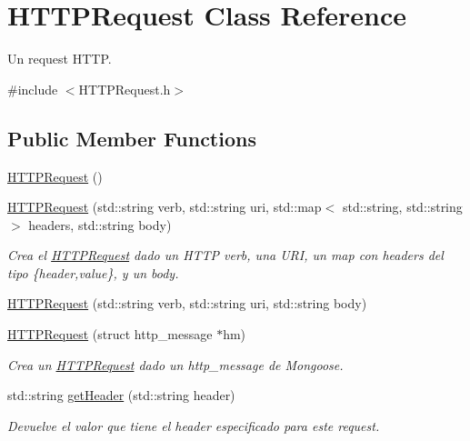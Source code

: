 \hypertarget{class_h_t_t_p_request}{}\section{H\+T\+T\+P\+Request Class Reference}
\label{class_h_t_t_p_request}


Un request H\+T\+T\+P.  




{\ttfamily \#include $<$H\+T\+T\+P\+Request.\+h$>$}

\subsection*{Public Member Functions}
\begin{DoxyCompactItemize}
\item 
\hyperlink{class_h_t_t_p_request_a7c53a92689eb5cee6b069a3db3c327ae}{H\+T\+T\+P\+Request} ()
\item 
\hyperlink{class_h_t_t_p_request_ae5880bda328e95165a150d5403a3cd22}{H\+T\+T\+P\+Request} (std\+::string verb, std\+::string uri, std\+::map$<$ std\+::string, std\+::string $>$ headers, std\+::string body)
\begin{DoxyCompactList}\small\item\em Crea el \hyperlink{class_h_t_t_p_request}{H\+T\+T\+P\+Request} dado un H\+T\+T\+P verb, una U\+R\+I, un map con headers del tipo \{header,value\}, y un body. \end{DoxyCompactList}\item 
\hyperlink{class_h_t_t_p_request_a8c872a6924151283710eeed82eb22478}{H\+T\+T\+P\+Request} (std\+::string verb, std\+::string uri, std\+::string body)
\item 
\hyperlink{class_h_t_t_p_request_af30941e3edf4dd0534ccee922b80d214}{H\+T\+T\+P\+Request} (struct http\+\_\+message $\ast$hm)
\begin{DoxyCompactList}\small\item\em Crea un \hyperlink{class_h_t_t_p_request}{H\+T\+T\+P\+Request} dado un http\+\_\+message de Mongoose. \end{DoxyCompactList}\item 
std\+::string \hyperlink{class_h_t_t_p_request_a1d399357b19166c7b4c624bbd73365c6}{get\+Header} (std\+::string header)
\begin{DoxyCompactList}\small\item\em Devuelve el valor que tiene el header especificado para este request. \end{DoxyCompactList}\item 

\end{DoxyCompactItemize}
